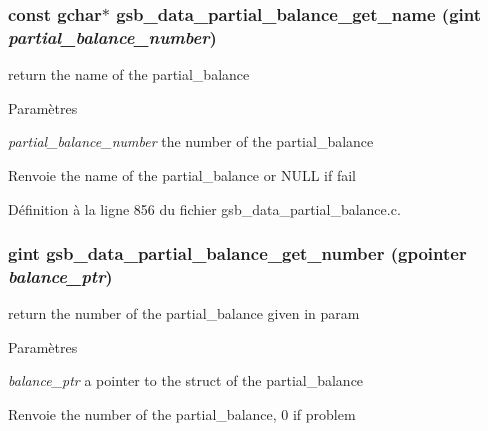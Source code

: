 \subsubsection[{gsb\_\-data\_\-partial\_\-balance\_\-get\_\-name}]{\setlength{\rightskip}{0pt plus 5cm}const gchar$\ast$ gsb\_\-data\_\-partial\_\-balance\_\-get\_\-name (gint {\em partial\_\-balance\_\-number})}\label{gsb__data__partial__balance_8c_a742abdf5e9bbd787e85bd0ef54b9fe8c}
return the name of the partial\_\-balance


\begin{DoxyParams}{Paramètres}
\item[{\em partial\_\-balance\_\-number}]the number of the partial\_\-balance\end{DoxyParams}
\begin{DoxyReturn}{Renvoie}
the name of the partial\_\-balance or NULL if fail 
\end{DoxyReturn}


Définition à la ligne 856 du fichier gsb\_\-data\_\-partial\_\-balance.c.

\subsubsection[{gsb\_\-data\_\-partial\_\-balance\_\-get\_\-number}]{\setlength{\rightskip}{0pt plus 5cm}gint gsb\_\-data\_\-partial\_\-balance\_\-get\_\-number (gpointer {\em balance\_\-ptr})}\label{gsb__data__partial__balance_8c_a645d1d88a2b73c7c48d218d5dc240ec4}
return the number of the partial\_\-balance given in param


\begin{DoxyParams}{Paramètres}
\item[{\em balance\_\-ptr}]a pointer to the struct of the partial\_\-balance\end{DoxyParams}
\begin{DoxyReturn}{Renvoie}
the number of the partial\_\-balance, 0 if problem 
\end{DoxyReturn}


